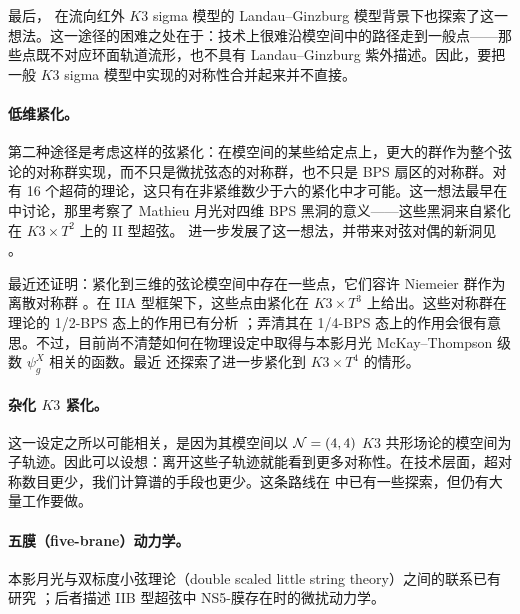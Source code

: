 \documentclass[11pt,a4paper,fontset=windows]{ctexart}
\numberwithin{equation}{section}
\newcommand{\myparagraph}[1]{\paragraph{#1}\mbox\\}
\newcommand{\ZZ}{\mathbb{Z}}
\begin{document}

最后，\cite{UMLG} 在流向红外 $K3$ sigma 模型的 Landau--Ginzburg 模型背景下也探索了这一想法。这一途径的困难之处在于：技术上很难沿模空间中的路径走到一般点——那些点既不对应环面轨道流形，也不具有 Landau--Ginzburg 紫外描述。因此，要把一般 $K3$ sigma 模型中实现的对称性合并起来并不直接。

\myparagraph{低维紧化。} 第二种途径是考虑这样的弦紧化：在模空间的某些给定点上，更大的群作为整个弦论的对称群实现，而不只是微扰弦态的对称群，也不只是 BPS 扇区的对称群。对有 16 个超荷的理论，这只有在非紧维数少于六的紧化中才可能。这一想法最早在 \cite{cheng2010k3} 中讨论，那里考察了 Mathieu 月光对四维 BPS 黑洞的意义——这些黑洞来自紧化在 $K3\times T^2$ 上的 II 型超弦。\cite{Persson:2013xpa} 进一步发展了这一想法，并带来对弦对偶的新洞见 \cite{Persson:2015jka}。


最近还证明：紧化到三维的弦论模空间中存在一些点，它们容许 Niemeier 群作为离散对称群 \cite{kachru20173d}。在 IIA 型框架下，这些点由紧化在 $K3\times T^3$ 上给出。这些对称群在理论的 1/2-BPS 态上的作用已有分析 \cite{kachru20173d}；弄清其在 1/4-BPS 态上的作用会很有意思。不过，目前尚不清楚如何在物理设定中取得与本影月光 McKay--Thompson 级数 $\psi^X_g$ 相关的函数。最近 \cite{Zimet:2018dev} 还探索了进一步紧化到 $K3\times T^4$ 的情形。


\myparagraph{杂化 $K3$ 紧化。} 这一设定之所以可能相关，是因为其模空间以 ${\cal N}=(4,4)$ $K3$ 共形场论的模空间为子轨迹。因此可以设想：离开这些子轨迹就能看到更多对称性。在技术层面，超对称数目更少，我们计算谱的手段也更少。这条路线在 \cite{cheng2013mathieu,Harrison:2013bya} 中已有一些探索，但仍有大量工作要做。

\myparagraph{五膜（five-brane）动力学。} 本影月光与双标度小弦理论（double scaled little string theory）之间的联系已有研究 \cite{Harvey:2013mda,Harvey:2014cva}；后者描述 IIB 型超弦中 NS5-膜存在时的微扰动力学。
\end{document}

